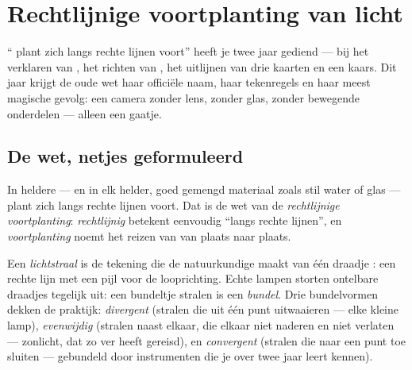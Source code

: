 \chapter{Rechtlijnige voortplanting van licht}\label{ch:g6:light-propagation}

`` plant zich langs rechte lijnen voort'' heeft je twee jaar
gediend --- bij het verklaren van , het richten van
, het uitlijnen van drie kaarten en een kaars. Dit jaar
krijgt de oude wet haar officiële naam, haar tekenregels en haar meest
magische gevolg: een camera zonder lens, zonder glas, zonder bewegende
onderdelen --- alleen een gaatje.

\section{De wet, netjes geformuleerd}

\begin{proposition}\label{prop:g6:light-propagation:law}
In heldere  --- en in elk helder, goed gemengd materiaal zoals
stil water of glas --- plant  zich langs rechte lijnen voort. Dat
is de wet van de \emph{rechtlijnige
voortplanting}: \emph{rechtlijnig}
betekent eenvoudig ``langs rechte lijnen'', en \emph{voortplanting}
noemt het reizen van  van plaats naar plaats.
\end{proposition}

\begin{definition}\label{def:g6:light-propagation:ray}
Een \emph{lichtstraal} is de tekening die de
natuurkundige maakt van één draadje : een rechte lijn met een
pijl voor de looprichting. Echte lampen storten ontelbare draadjes
tegelijk uit: een bundeltje stralen is een \emph{bundel}.
Drie bundelvormen dekken de praktijk: \emph{divergent} (stralen die
uit één punt uitwaaieren --- elke kleine lamp), \emph{evenwijdig}
(stralen naast elkaar, die elkaar niet naderen en niet verlaten ---
zonlicht, dat zo ver heeft gereisd), en \emph{convergent} (stralen die
naar een punt toe sluiten ---  gebundeld door instrumenten die je
over twee jaar leert kennen).
\end{definition}

